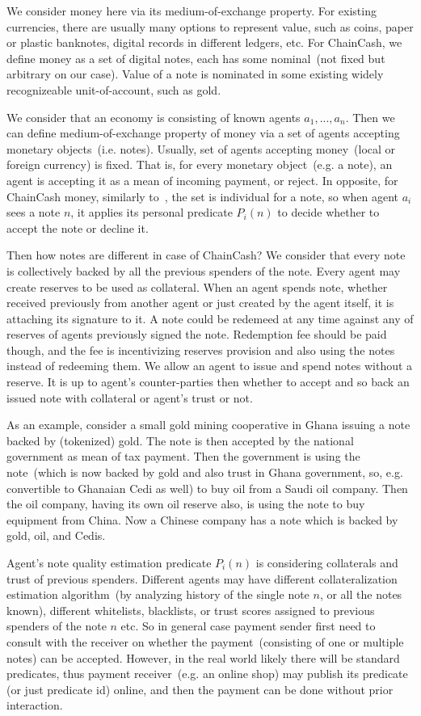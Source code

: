 \documentclass{article}   %
\newcommand{\cc}{ChainCash}
\begin{document}
We consider money here via its medium-of-exchange property. For existing currencies, there are usually many options to represent value, such as coins, paper or plastic banknotes, digital records in different ledgers, etc. For \cc{}, we define money as a set of digital notes, each has some nominal~(not fixed but arbitrary on our case). Value of a note is nominated in some existing widely recognizeable unit-of-account, such as gold. 

We consider that an economy is consisting of known agents $a_1, ..., a_n$. Then we can define medium-of-exchange property of money via a set of agents accepting monetary objects~(i.e. notes). Usually, set of agents accepting money~(local or foreign currency) is fixed. That is, for every monetary object~(e.g. a note), an agent is accepting it as a mean of incoming payment, or reject. In opposite, for \cc{} money, similarly to~\cite{saito2003peer}, the set is individual for a note, so when agent $a_i$ sees a note $n$, it applies its personal predicate $P_i(n)$ to decide whether to accept the note or decline it. 

Then how notes are different in case of \cc{}? We consider that every note is collectively backed by all the previous spenders of the note. Every agent may create reserves to be used as collateral. When an agent spends note, whether received previously from another agent or just created by the agent itself, it is attaching its signature to it. A note could be redemeed at any time against any of reserves of agents previously signed the note. Redemption fee should be paid though, and the fee is incentivizing reserves provision and also using the notes instead of redeeming them. We allow an agent to issue and spend notes without a reserve. It is up to agent's counter-parties then whether to accept and so back an issued note with collateral or agent's trust or not.

As an example, consider a small gold mining cooperative in Ghana issuing a note backed by (tokenized) gold. The note is then accepted by the national government as mean of tax payment. Then the government is using the note~(which is now backed by gold and also trust in Ghana government, so, e.g. convertible to Ghanaian Cedi as well) to buy oil from a Saudi oil company. Then the oil company, having its own oil reserve also, is using the note to buy equipment from China. Now a Chinese company has a note which is backed by gold, oil, and Cedis. 

Agent's note quality estimation predicate $P_i(n)$ is considering collaterals and trust of previous spenders. Different agents may have different 
collateralization estimation algorithm~(by analyzing history of the single note $n$, or all the notes known), different whitelists, blacklists, or trust scores assigned to previous spenders of the note $n$ etc. So in general case payment sender first need to consult with the receiver on whether the payment~(consisting of one or multiple notes) can be accepted. However, in the real world likely there will be standard predicates, thus payment receiver~(e.g. an online shop) may publish its predicate (or just predicate id) online, and then the payment can be done without prior interaction.
\end{document}
